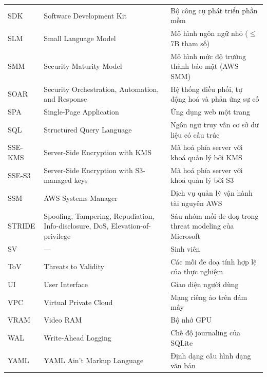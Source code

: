 \begin{longtable}{p{2.2cm} p{5.6cm} p{6.4cm}}
  SDK     & Software Development Kit                                  & Bộ công cụ phát triển phần mềm \\
  SLM     & Small Language Model                                      & Mô hình ngôn ngữ nhỏ ($\le$ 7B tham số) \\
  SMM     & Security Maturity Model                                   & Mô hình mức độ trưởng thành bảo mật (AWS SMM) \\
  SOAR    & Security Orchestration, Automation, and Response          & Hệ thống điều phối, tự động hoá và phản ứng sự cố \\
  SPA     & Single-Page Application                                   & Ứng dụng web một trang \\
  SQL     & Structured Query Language                                 & Ngôn ngữ truy vấn cơ sở dữ liệu có cấu trúc \\
  SSE-KMS & Server-Side Encryption with KMS                           & Mã hoá phía server với khoá quản lý bởi KMS \\
  SSE-S3  & Server-Side Encryption with S3-managed keys               & Mã hoá phía server với khoá quản lý bởi S3 \\
  SSM     & AWS Systems Manager                                       & Dịch vụ quản lý vận hành tài nguyên AWS \\
  STRIDE  & Spoofing, Tampering, Repudiation, Info-disclosure, DoS, Elevation-of-privilege & Sáu nhóm mối đe doạ trong threat modeling của Microsoft \\
  SV      & ---                                                       & Sinh viên \\
  ToV     & Threats to Validity                                       & Các mối đe doạ tính hợp lệ của thực nghiệm \\
  UI      & User Interface                                            & Giao diện người dùng \\
  VPC     & Virtual Private Cloud                                     & Mạng riêng ảo trên đám mây \\
  VRAM    & Video RAM                                                 & Bộ nhớ GPU \\
  WAL     & Write-Ahead Logging                                       & Chế độ journaling của SQLite \\
  YAML    & YAML Ain't Markup Language                                & Định dạng cấu hình dạng văn bản \\
\end{longtable}
